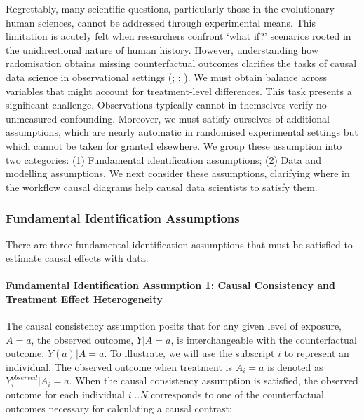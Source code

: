 \documentclass[
  singlecolumn,
  9pt]{article}
\let\oldparagraph\paragraph
\renewcommand{\paragraph}[1]{\oldparagraph{#1}\mbox{}}
\begin{document}
Regrettably, many scientific questions, particularly those in the
evolutionary human sciences, cannot be addressed through experimental
means. This limitation is acutely felt when researchers confront `what
if?' scenarios rooted in the unidirectional nature of human history.
However, understanding how radomisation obtains missing counterfactual
outcomes clarifies the tasks of causal data science in observational
settings (;
;
). We must obtain
balance across variables that might account for treatment-level
differences. This task presents a significant challenge. Observations
typically cannot in themselves verify no-unmeasured confounding.
Moreover, we must satisfy ourselves of additional assumptions, which are
nearly automatic in randomised experimental settings but which cannot be
taken for granted elsewhere. We group these assumption into two
categories: (1) Fundamental identification assumptions; (2) Data and
modelling assumptions. We next consider these assumptions, clarifying
where in the workflow causal diagrams help causal data scientists to
satisfy them.

\subsubsection{Fundamental Identification
Assumptions}\label{fundamental-identification-assumptions}

There are three fundamental identification assumptions that must be
satisfied to estimate causal effects with data.

\paragraph{Fundamental Identification Assumption 1: Causal Consistency
and Treatment Effect
Heterogeneity}\label{fundamental-identification-assumption-1-causal-consistency-and-treatment-effect-heterogeneity}

The causal consistency assumption posits that for any given level of
exposure, \(A=a\), the observed outcome, \(Y|A=a\), is interchangeable
with the counterfactual outcome: \(Y(a)|A = a\). To illustrate, we will
use the subscript \(i\) to represent an individual. The observed outcome
when treatment is \(A_i = a\) is denoted as \(Y_i^{observed}|A_i = a\).
When the causal consistency assumption is satisfied, the observed
outcome for each individual \(i...N\) corresponds to one of the
counterfactual outcomes necessary for calculating a causal contrast:
\end{document}
